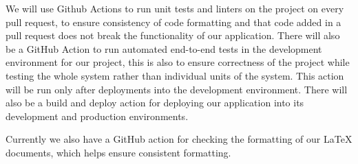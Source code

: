 \documentclass{article}
\begin{document}
We will use Github Actions to run unit tests and linters on the
project on every pull request, to ensure consistency of code
formatting and that code added in a pull request does not break the
functionality of our application. There will also be a GitHub Action
to run automated end-to-end tests in the development environment for
our project, this is also to ensure correctness of the project while
testing the whole system rather than individual units of the system.
This action will be run only after deployments into the development
environment. There will also be a build and deploy action for
deploying our application into its development and production environments.

Currently we also have a GitHub action for checking the formatting of
our LaTeX documents, which helps ensure consistent formatting.
\end{document}
